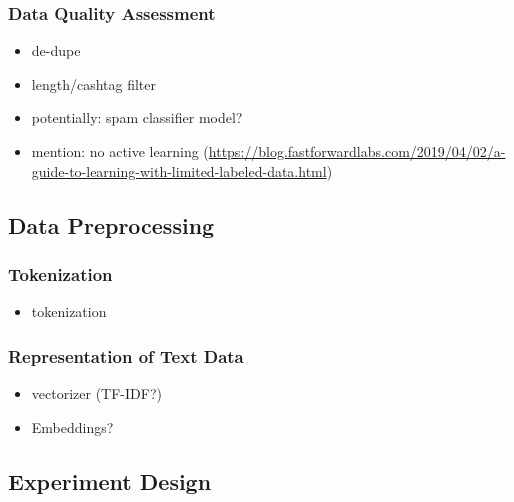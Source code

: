 \subsubsection{Data Quality Assessment}  %
\begin{itemize}[noitemsep]
	\item de-dupe
	\item length/cashtag filter
	\item potentially: spam classifier model?
	\item mention: no active learning (\url{https://blog.fastforwardlabs.com/2019/04/02/a-guide-to-learning-with-limited-labeled-data.html})
\end{itemize}




\subsection{Data Preprocessing}

\subsubsection{Tokenization}
\begin{itemize}[noitemsep]
	\item tokenization
\end{itemize}

\subsubsection{Representation of Text Data}
\begin{itemize}[noitemsep]
	\item vectorizer (TF-IDF?)
	\item Embeddings?
\end{itemize}






\subsection{Experiment Design}

